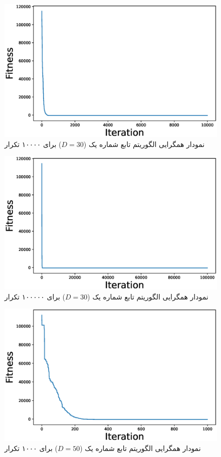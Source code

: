 \begin{figure}[H]
	\caption{نمودار همگرایی الگوریتم  تابع شماره یک ($D=30$) برای ۱۰۰۰۰ تکرار } 
	\centering 
	\includegraphics[width=16cm]{../Figure/Q1/PSO_convergence_curve_30_ite_10000} 
\end{figure}

\begin{figure}[H]
	\caption{نمودار همگرایی الگوریتم  تابع شماره یک ($D=30$) برای ۱۰۰۰۰۰ تکرار } 
	\centering 
	\includegraphics[width=16cm]{../Figure/Q1/PSO_convergence_curve_30_ite_100000} 
\end{figure}


 \begin{figure}[H]
	\caption{نمودار همگرایی الگوریتم  تابع شماره یک ($D=50$) برای ۱۰۰۰ تکرار } 
	\centering 
	\includegraphics[width=16cm]{../Figure/Q1/PSO_convergence_curve_50_ite_1000} 
\end{figure}


